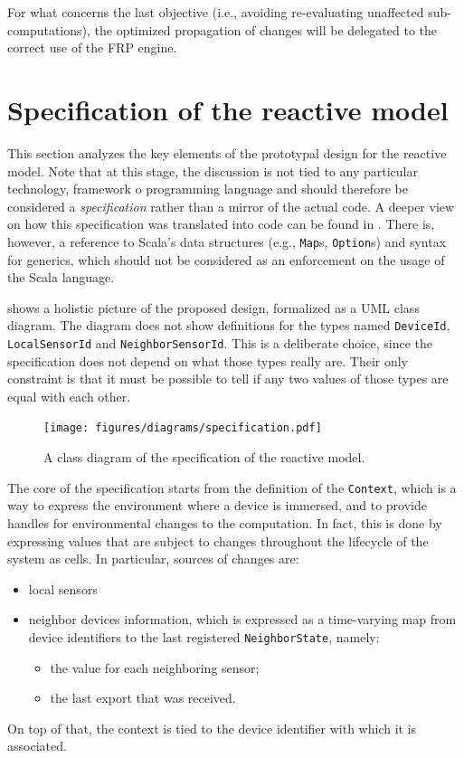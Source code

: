 For what concerns the last objective (i.e., avoiding re-evaluating unaffected sub-computations), the optimized propagation of changes will be delegated to the correct use of the FRP engine.

\section{Specification of the reactive model}
\label{sec:specification}

This section analyzes the key elements of the prototypal design for the reactive model.
%
Note that at this stage, the discussion is not tied to any particular technology, framework o programming language and should therefore be considered a \textit{specification} rather than a mirror of the actual code.
%
A deeper view on how this specification was translated into code can be found in .
% 
There is, however, a reference to Scala's data structures (e.g., \texttt{Map}s, \texttt{Option}s) and syntax for generics, which should not be considered as an enforcement on the usage of the Scala language.

 shows a holistic picture of the proposed design, formalized as a UML class diagram.
%
The diagram does not show definitions for the types named \texttt{DeviceId}, \texttt{LocalSensorId} and \texttt{NeighborSensorId}.
%
This is a deliberate choice, since the specification does not depend on what those types really are.
%
Their only constraint is that it must be possible to tell if any two values of those types are equal with each other.
%
\begin{figure}
    \centering
    \texttt{[image: figures/diagrams/specification.pdf]}
    \caption{A class diagram of the specification of the reactive model.}
    \label{fig:class-diagram}
\end{figure}

The core of the specification starts from the definition of the \texttt{Context}, which is a way to express the environment where a device is immersed, and to provide handles for environmental changes to the computation.
%
In fact, this is done by expressing values that are subject to changes throughout the lifecycle of the system as cells.
%
In particular, sources of changes are:
%
\begin{itemize}
    \item local sensors
    \item neighbor devices information, which is expressed as a time-varying map from device identifiers to the last registered \texttt{NeighborState}, namely:
    \begin{itemize}
        \item the value for each neighboring sensor;
        \item the last export that was received.
    \end{itemize}
\end{itemize}
%
On top of that, the context is tied to the device identifier with which it is associated.

